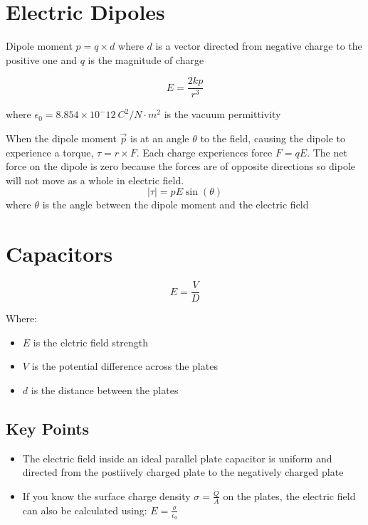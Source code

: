 \documentclass{article}
\begin{document}
\section*{Electric Dipoles}
Dipole moment $p=q\times d$ where $d$ is a vector directed from negative charge to the positive one
and $q$ is the magnitude of charge

\[E=\frac{2kp}{r^3}\]

where $\epsilon_0=8.854\times 10^-12\: C^2 / N\cdot m^2$ is the vacuum permittivity

When the dipole moment $\vec{p}$ is at an angle $\theta$ to the field, causing the dipole to
experience a torque, $\tau = r\times F$. Each charge experiences force $F=qE$. The net force on the
dipole is zero because the forces are of opposite directions so dipole will not move as a whole in
electric field.
\[|\tau | = pE\sin (\theta)\] where $\theta$ is the angle between the dipole moment and the
electric field

\section*{Capacitors}

\[E=\frac{V}{D}\]

Where:
\begin{itemize}
    \item $E$ is the elctric field strength
    \item $V$ is the potential difference across the plates
    \item $d$ is the distance between the plates
\end{itemize}

\subsection*{Key Points}
\begin{itemize}
    \item The electric field inside an ideal parallel plate capacitor is uniform and directed from the postiively charged plate to the negatively charged plate
    \item If you know the surface charge density $\sigma=\frac{Q}{A}$ on the plates, the electric field can also be calculated using: $E=\frac{\sigma}{\epsilon_0}$
\end{itemize}
\end{document}
